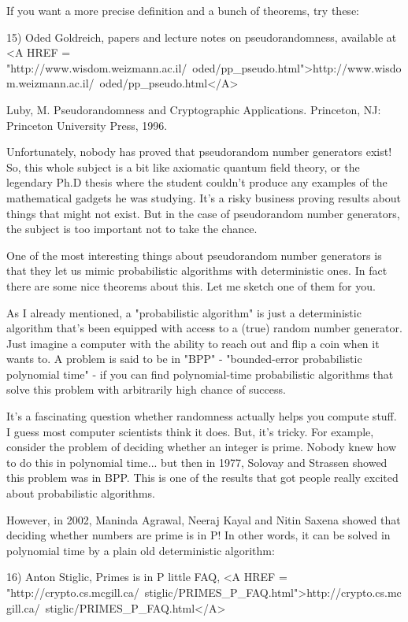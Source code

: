 If you want a more precise definition and a bunch of theorems, try these:

15) Oded Goldreich, papers and lecture notes on pseudorandomness,
available at <A HREF = "http://www.wisdom.weizmann.ac.il/~oded/pp_pseudo.html">http://www.wisdom.weizmann.ac.il/~oded/pp_pseudo.html</A>

Luby, M. Pseudorandomness and Cryptographic Applications. 
Princeton, NJ: Princeton University Press, 1996.

Unfortunately, nobody has proved that pseudorandom number generators
exist!  So, this whole subject is a bit like axiomatic quantum field
theory, or the legendary Ph.D thesis where the student couldn't produce
any examples of the mathematical gadgets he was studying.  It's a
risky business proving results about things that might not exist.
But in the case of pseudorandom number generators, the subject is
too important not to take the chance.

One of the most interesting things about pseudorandom number generators is 
that they let us mimic probabilistic algorithms with deterministic ones.  
In fact there are some nice theorems about this.  Let me sketch one of
them for you.

As I already mentioned, a "probabilistic algorithm" is just a deterministic 
algorithm that's been equipped with access to a (true) random number 
generator.   Just imagine a computer with the ability to reach out and 
flip a coin when it wants to.  A problem is said to be in "BPP" - 
"bounded-error probabilistic polynomial time" - if you can find 
polynomial-time probabilistic algorithms that solve this problem 
with arbitrarily high chance of success.  

It's a fascinating question whether randomness actually helps you compute
stuff.  I guess most computer scientists think it does.  But, it's tricky.  
For example, consider the problem of deciding whether an integer is prime.  
Nobody knew how to do this in polynomial time... but then in 1977, Solovay
and Strassen showed this problem was in BPP.  This is one of the results
that got people really excited about probabilistic algorithms.

However, in 2002, Maninda Agrawal, Neeraj Kayal and Nitin Saxena showed 
that deciding whether numbers are prime is in P!  In other words, it can 
be solved in polynomial time by a plain old deterministic algorithm:

16) Anton Stiglic, Primes is in P little FAQ,
<A HREF = "http://crypto.cs.mcgill.ca/~stiglic/PRIMES_P_FAQ.html">http://crypto.cs.mcgill.ca/~stiglic/PRIMES_P_FAQ.html</A>

